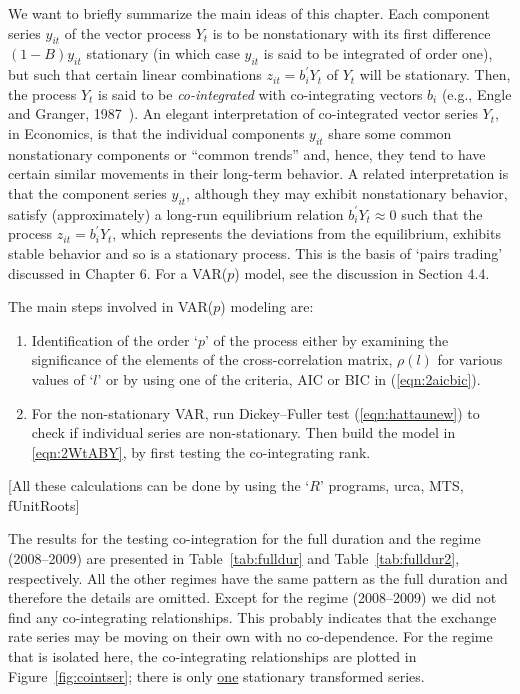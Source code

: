 We want to briefly summarize the main ideas of this chapter. Each component series $y_{it}$ of the vector process $Y_t$ is to be nonstationary with its first difference $(1\!-\!B) y_{it}$ stationary (in which case $y_{it}$ is said to be integrated of order one), but such that certain linear combinations $z_{it} = b_i^{\prime} Y_t $ of $Y_t$ will be stationary. Then, the process $Y_t$ is said to be \emph{co-integrated} with co-integrating vectors $b_i$ (e.g., Engle and Granger, 1987~\cite{engle1987co}). An elegant interpretation of co-integrated vector series $Y_t$, in Economics, is that the individual components $y_{it}$ share some common nonstationary components or ``common trends'' and, hence, they tend to have certain similar movements in their long-term behavior. A related interpretation is that the component series $y_{it}$, although they may exhibit nonstationary behavior, satisfy (approximately) a long-run equilibrium relation $b_i^{\prime} Y_t \approx 0$ such that the process $z_{it} = b_i^{\prime} Y_t$, which represents the deviations from the equilibrium, exhibits stable behavior and so is a stationary process. This is the basis of `pairs trading' discussed in Chapter 6. For a VAR($p$) model, see the discussion in Section 4.4.


The main steps involved in VAR($p$) modeling are:
	\begin{enumerate}[--]
	\item Identification of the order `$p$' of the process either by examining the significance of the elements of the cross-correlation matrix, $\rho(l)$ for various values of `$l$' or by using one of the criteria, AIC or BIC in (\ref{eqn:2aicbic}).
	\item For the non-stationary VAR, run Dickey--Fuller test (\ref{eqn:hattaunew}) to check if individual series are non-stationary. Then build the model in \ref{eqn:2WtABY}, by first testing the co-integrating rank. 
	\end{enumerate}
[All these calculations can be done by using the `$R$' programs, urca, MTS, fUnitRoots]


The results for the testing co-integration for the full duration and the regime (2008--2009) are presented in Table~\ref{tab:fulldur} and Table~\ref{tab:fulldur2}, respectively. All the other regimes have the same pattern as the full duration and therefore the details are omitted. Except for the regime (2008--2009) we did not find any co-integrating relationships. This probably indicates that the exchange rate series may be moving on their own with no co-dependence. For the regime that is isolated here, the co-integrating relationships are plotted in Figure~\ref{fig:cointser}; there is only \underline{one} stationary transformed series.

